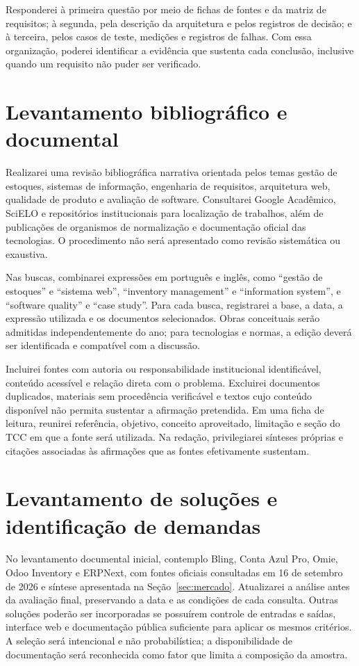 Responderei à primeira questão por meio de fichas de fontes e da matriz de requisitos; à segunda, pela descrição da arquitetura e pelos registros de decisão; e à terceira, pelos casos de teste, medições e registros de falhas. Com essa organização, poderei identificar a evidência que sustenta cada conclusão, inclusive quando um requisito não puder ser verificado.

\section{Levantamento bibliográfico e documental}

Realizarei uma revisão bibliográfica narrativa orientada pelos temas gestão de estoques, sistemas de informação, engenharia de requisitos, arquitetura web, qualidade de produto e avaliação de software. Consultarei Google Acadêmico, SciELO e repositórios institucionais para localização de trabalhos, além de publicações de organismos de normalização e documentação oficial das tecnologias. O procedimento não será apresentado como revisão sistemática ou exaustiva.

Nas buscas, combinarei expressões em português e inglês, como ``gestão de estoques'' e ``sistema web'', ``inventory management'' e ``information system'', e ``software quality'' e ``case study''. Para cada busca, registrarei a base, a data, a expressão utilizada e os documentos selecionados. Obras conceituais serão admitidas independentemente do ano; para tecnologias e normas, a edição deverá ser identificada e compatível com a discussão.

Incluirei fontes com autoria ou responsabilidade institucional identificável, conteúdo acessível e relação direta com o problema. Excluirei documentos duplicados, materiais sem procedência verificável e textos cujo conteúdo disponível não permita sustentar a afirmação pretendida. Em uma ficha de leitura, reunirei referência, objetivo, conceito aproveitado, limitação e seção do TCC em que a fonte será utilizada. Na redação, privilegiarei sínteses próprias e citações associadas às afirmações que as fontes efetivamente sustentam.

\section{Levantamento de soluções e identificação de demandas}

No levantamento documental inicial, contemplo Bling, Conta Azul Pro, Omie, Odoo Inventory e ERPNext, com fontes oficiais consultadas em 16 de setembro de 2026 e síntese apresentada na Seção~\ref{sec:mercado}. Atualizarei a análise antes da avaliação final, preservando a data e as condições de cada consulta. Outras soluções poderão ser incorporadas se possuírem controle de entradas e saídas, interface web e documentação pública suficiente para aplicar os mesmos critérios. A seleção será intencional e não probabilística; a disponibilidade de documentação será reconhecida como fator que limita a composição da amostra.


